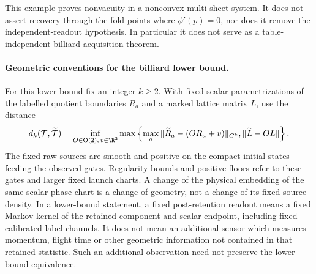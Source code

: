 This example proves nonvacuity in a nonconvex multi-sheet system.  It
does not assert recovery through the fold points where $\phi'(p)=0$,
nor does it remove the independent-readout hypothesis.  In particular
it does not serve as a table-independent billiard acquisition theorem.

\paragraph{Geometric conventions for the billiard lower bound.}
For this lower bound fix an integer $k\ge2$.  With fixed scalar
parametrizations of the labelled quotient boundaries $R_a$ and a marked
lattice matrix $L$, use the distance
\[
 d_k(\mathcal T,\widetilde{\mathcal T})=
 \inf_{O\in\mathrm O(2),\,v\in\R^2}
 \max\left\{\max_a\|\widetilde R_a-(OR_a+v)\|_{C^k},
                     \|\widetilde L-OL\|\right\}.
\]
The fixed raw sources are smooth and positive on the compact initial
states feeding the observed gates.  Regularity bounds and positive
floors refer to these gates and larger fixed launch charts.  A change
of the physical embedding of the same scalar phase chart is a change
of geometry, not a change of its fixed source density.
In a lower-bound statement, a fixed post-retention readout means a fixed
Markov kernel of the retained component and scalar endpoint, including
fixed calibrated label channels.  It does not mean an additional sensor
which measures momentum, flight time or other geometric information
not contained in that retained statistic.  Such an additional observation
need not preserve the lower-bound equivalence.
